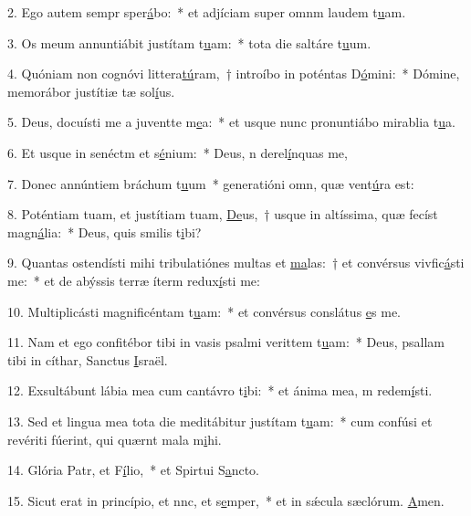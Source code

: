 2. Ego autem sempr sper\uline{á}bo:~* et adjíciam super omnm laudem t\uline{u}am.\par 
3. Os meum annuntiábit justítam t\uline{u}am:~* tota die saltáre t\uline{u}um.\par 
4. Quóniam non cognóvi littera\uline{tú}ram,~† introíbo in poténtas D\uline{ó}mini:~* Dómine, memorábor justítiæ tæ sol\uline{í}us.\par 
5. Deus, docuísti me a juventte m\uline{e}a:~* et usque nunc pronuntiábo mirablia t\uline{u}a.\par 
6. Et usque in senéctm et s\uline{é}nium:~* Deus, n derel\uline{í}nquas me,\par 
7. Donec annúntiem bráchum t\uline{u}um~* generatióni omn, quæ vent\uline{ú}ra est:\par 
8. Poténtiam tuam, et justítiam tuam, \uline{De}us,~† usque in altíssima, quæ fecíst magn\uline{á}lia:~* Deus, quis smilis t\uline{i}bi?\par 
9. Quantas ostendísti mihi tribulatiónes multas et \uline{ma}las:~† et convérsus vivfic\uline{á}sti me:~* et de abýssis terræ íterm redux\uline{í}sti me:\par 
10. Multiplicásti magnificéntam t\uline{u}am:~* et convérsus conslátus \uline{e}s me.\par 
11. Nam et ego confitébor tibi in vasis psalmi verittem t\uline{u}am:~* Deus, psallam tibi in cíthar, Sanctus \uline{I}sraël.\par 
12. Exsultábunt lábia mea cum cantávro t\uline{i}bi:~* et ánima mea, m redem\uline{í}sti.\par 
13. Sed et lingua mea tota die meditábitur justítam t\uline{u}am:~* cum confúsi et revériti fúerint, qui quærnt mala m\uline{i}hi.\par 
14. Glória Patr, et F\uline{í}lio,~* et Spirtui S\uline{a}ncto.\par 
15. Sicut erat in princípio, et nnc, et s\uline{e}mper,~* et in sǽcula sæclórum. \uline{A}men.\par 

